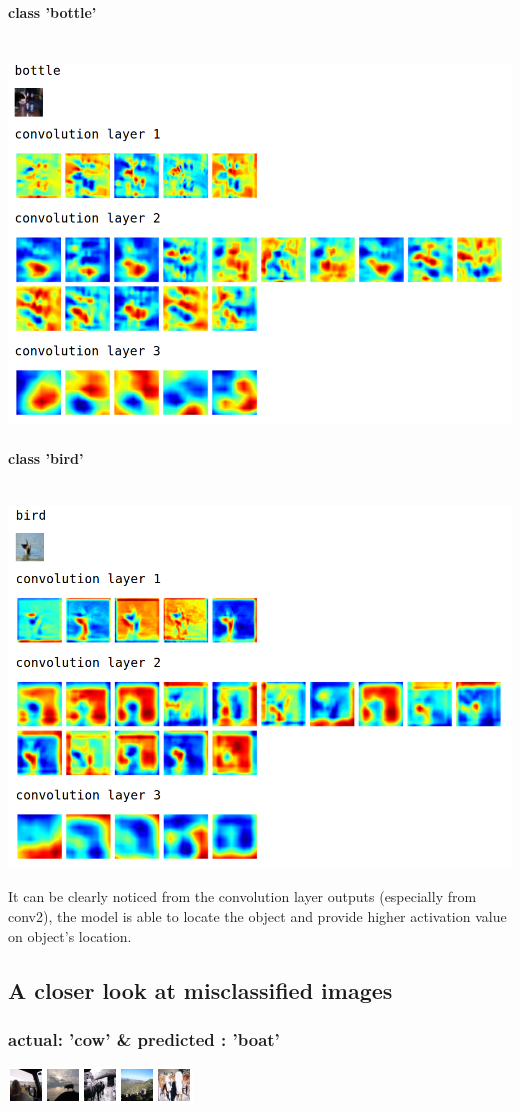 \documentclass[fleqn]{article}
\newcommand{\myparagraph}[1]{\paragraph{#1}\mbox{}\\}
\begin{document}
\myparagraph{class 'bottle'}
\includegraphics[scale=0.4]{./pics/bottle_hidden_layers.png}\\
\myparagraph{class 'bird'}
\includegraphics[scale=0.4]{./pics/bird_hidden_layers.png}

It can be clearly noticed from the convolution layer outputs (especially from conv2), the model is able to locate the object and provide higher activation value on object's location.\\

\subsection{A closer look at misclassified images}

\subsubsection{actual: 'cow' \& predicted : 'boat'}
\includegraphics[scale=1.5]{./pics/miscallssify_cow_to_boat.png}\\
\end{document}
